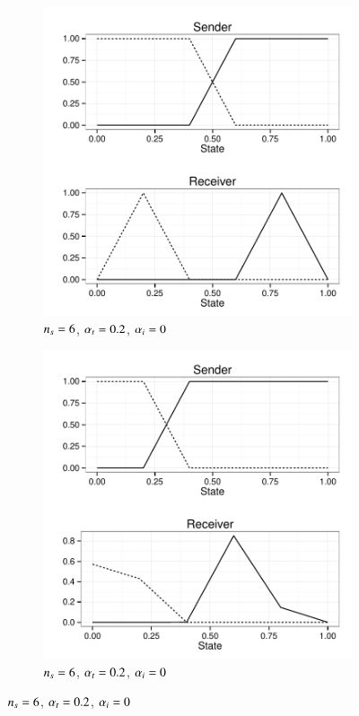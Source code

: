 \begin{figure}
  \centering

  \begin{subfigure}[]{0.45\textwidth}
    \includegraphics[width=\textwidth]{plots/strat_example_NS-6_tol-03_imp005_ind41.pdf}
    \caption{$n_s = 6$, $\alpha_t = 0.2$, $\alpha_i = 0$}
    \label{fig:example_stratsC}
  \end{subfigure}
  \hfill
  \begin{subfigure}[]{0.45\textwidth}
    \includegraphics[width=\textwidth]{plots/strat_example_NS-6_tol-03_imp005_ind23.pdf}
    \caption{$n_s = 6$, $\alpha_t = 0.2$, $\alpha_i = 0$}
    \label{fig:example_stratsD}
  \end{subfigure}


\end{figure}
